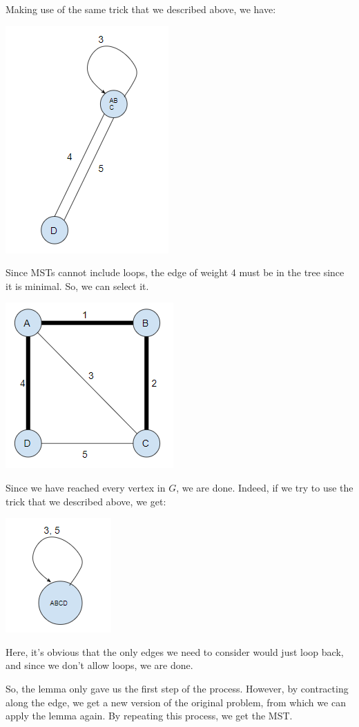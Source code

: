 \documentclass[letterpaper]{article}
\begin{document}
\begin{mdframed}[]
\begin{center}
    \end{center}
    Making use of the same trick that we described above, we have: 
    \begin{center}
        \includegraphics[scale=0.8]{../assets/mst_3a.png}
    \end{center}
    Since MSTs cannot include loops, the edge of weight 4 must be in the tree since it is minimal. So, we can select it.
    \begin{center}
        \includegraphics[scale=0.8]{../assets/mst_4.png}
    \end{center}
    Since we have reached every vertex in $G$, we are done. Indeed, if we try to use the trick that we described above, we get: 
    \begin{center}
        \includegraphics[scale=0.8]{../assets/mst_4a.png}
    \end{center}
    Here, it's obvious that the only edges we need to consider would just loop back, and since we don't allow loops, we are done. 
\end{mdframed}
So, the lemma only gave us the first step of the process. However, by contracting along the edge, we get a new version of the original problem, from which we can apply the lemma again. By repeating this process, we get the MST. 
\end{document}
